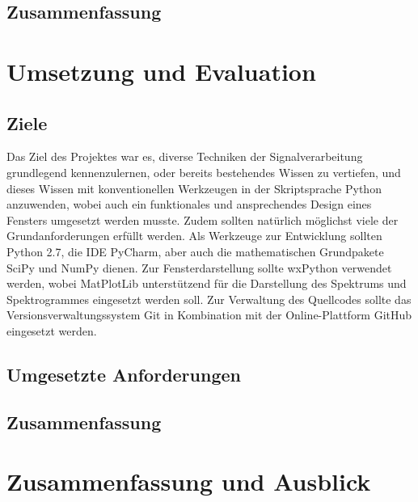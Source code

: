 \documentclass[a4paper]{article}
\begin{document}
\subsection{Zusammenfassung}

\newpage
\section{Umsetzung und Evaluation}

\subsection{Ziele}

Das Ziel des Projektes war es, diverse Techniken der Signalverarbeitung grundlegend kennenzulernen, oder bereits bestehendes Wissen zu vertiefen, und dieses Wissen mit konventionellen Werkzeugen in der Skriptsprache Python anzuwenden, wobei auch ein funktionales und ansprechendes Design eines Fensters umgesetzt werden musste. Zudem sollten natürlich möglichst viele der Grundanforderungen erfüllt werden. Als Werkzeuge zur Entwicklung sollten Python 2.7, die IDE PyCharm, aber auch die mathematischen Grundpakete SciPy und NumPy dienen. Zur Fensterdarstellung sollte wxPython verwendet werden, wobei MatPlotLib unterstützend für die Darstellung des Spektrums und Spektrogrammes eingesetzt werden soll. Zur Verwaltung des Quellcodes sollte das Versionsverwaltungssystem Git in Kombination mit der Online-Plattform GitHub eingesetzt werden.

\subsection{Umgesetzte Anforderungen}

\subsection{Zusammenfassung}

\newpage
\section{Zusammenfassung und Ausblick}
\end{document}

